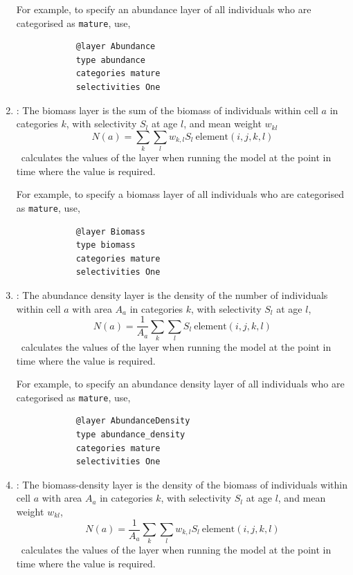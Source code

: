 \begin{enumerate}
	For example, to specify an abundance layer of all individuals who are categorised as \texttt{mature}, use,
	{\small{\begin{verbatim}
			@layer Abundance
			type abundance
			categories mature
			selectivities One
			\end{verbatim}}}
	
	\item {}: The biomass layer is the sum of the biomass of individuals within cell $a$ in categories $k$, with selectivity $S_l$ at age $l$, and mean weight $w_{kl}$
	\begin{equation}
	N(a) = \sum\limits_{k} \sum\limits_l w_{k,l} S_l \ \text{element}(i,j,k,l) 
	\end{equation}
	\IBM\ calculates the values of the layer when running the model at the point in time where the value is required.
	
	For example, to specify a biomass layer of all individuals who are categorised as \texttt{mature}, use,
	{\small{\begin{verbatim}
			@layer Biomass
			type biomass
			categories mature
			selectivities One
			\end{verbatim}}}
	
	\item {}: The abundance density layer is the density of the number of individuals within cell $a$ with area $A_a$ in categories $k$, with selectivity $S_l$ at age $l$,
	\begin{equation}
	N(a) = \frac{1}{A_a} \sum\limits_{k} \sum\limits_l S_l \ \text{element}(i,j,k,l)
	\end{equation}
	\IBM\ calculates the values of the layer when running the model at the point in time where the value is required.
	
	For example, to specify an abundance density layer of all individuals who are categorised as \texttt{mature}, use,
	{\small{\begin{verbatim}
			@layer AbundanceDensity
			type abundance_density
			categories mature
			selectivities One
			\end{verbatim}}}
	
	\item {}: The biomass-density layer is the density of the biomass of individuals within cell $a$ with area $A_a$ in categories $k$, with selectivity $S_l$ at age $l$, and mean weight $w_{kl}$,
	\begin{equation}
	N(a) = \frac{1}{A_a} \sum\limits_{k} \sum\limits_l w_{k,l} S_l \ \text{element}(i,j,k,l)
	\end{equation}
	\IBM\ calculates the values of the layer when running the model at the point in time where the value is required.
	

\end{enumerate}
